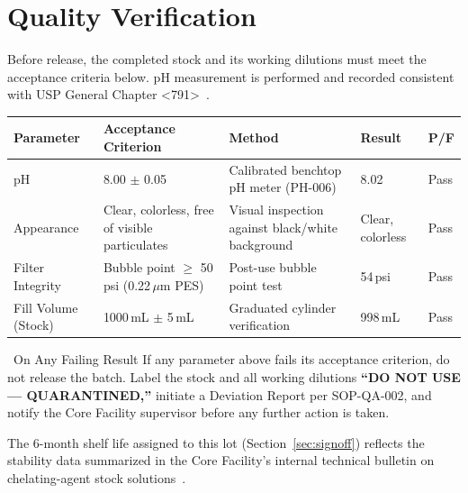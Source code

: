 \section{Quality Verification}
\label{sec:qc}

Before release, the completed stock and its working dilutions must meet the acceptance
criteria below. pH measurement is performed and recorded consistent with USP General
Chapter \textless791\textgreater~\cite{usp791}.

\begin{tabularx}{\textwidth}{@{}p{2.6cm}Xp{3.4cm}p{1.6cm}p{1.4cm}@{}}
\toprule
\textbf{Parameter} & \textbf{Acceptance Criterion} & \textbf{Method} & \textbf{Result} & \textbf{P/F} \\
\midrule
pH & 8.00 $\pm$ 0.05 & Calibrated benchtop pH meter (PH-006) & 8.02 & Pass \\
\rowcolor{labteal!5}
Appearance & Clear, colorless, free of visible particulates & Visual inspection against black/white background & Clear, colorless & Pass \\
Filter Integrity & Bubble point $\geq$ 50\,psi (0.22\,$\mu$m PES) & Post-use bubble point test & 54\,psi & Pass \\
\rowcolor{labteal!5}
Fill Volume (Stock) & 1000\,mL $\pm$ 5\,mL & Graduated cylinder verification & 998\,mL & Pass \\
\bottomrule
\end{tabularx}

\begin{hazardbox}{\faExclamationTriangle\ On Any Failing Result}
If any parameter above fails its acceptance criterion, do not release the batch. Label the
stock and all working dilutions \textbf{``DO NOT USE --- QUARANTINED,''} initiate a
Deviation Report per SOP-QA-002, and notify the Core Facility supervisor before any further
action is taken.
\end{hazardbox}

The 6-month shelf life assigned to this lot (Section~\ref{sec:signoff}) reflects the stability
data summarized in the Core Facility's internal technical bulletin on chelating-agent stock
solutions~\cite{meridian_tb}.
